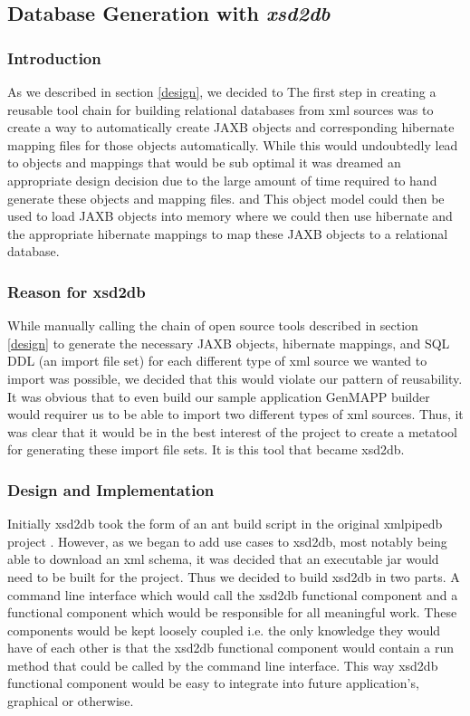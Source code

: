\subsection{Database Generation with \emph{xsd2db}}
\label{xsd2db}
\subsubsection{Introduction}
As we described in section \ref{design}, we decided to 
The first step in creating a reusable tool chain for building relational databases from xml sources was to create a way to automatically create JAXB objects and corresponding hibernate mapping files for those objects automatically.  While this would undoubtedly lead to objects and mappings that would be sub optimal it was dreamed an appropriate design decision due to the large amount of time required to hand generate these objects and mapping files.  and   This object model could then be used to load JAXB objects into memory where we could then use hibernate and the appropriate hibernate mappings to map these JAXB objects to a relational database. 

\subsubsection{Reason for xsd2db}
While manually calling the chain of open source tools described in section \ref{design} to generate the necessary JAXB objects, hibernate mappings, and SQL DDL (an import file set) for each different type of xml source we wanted to import was possible, we decided that this would violate our pattern of reusability.  It was obvious that to even build our sample application GenMAPP builder would requirer us to be able to import two different types of xml sources.   Thus, it was clear that it would be in the best interest of the project to create a metatool for generating these import file sets.  It is this tool that became xsd2db.    
\subsubsection{Design and Implementation}
Initially xsd2db took the form of an ant build script in the original xmlpipedb project \cite{xmlpipedb}.  However, as we began to add use cases to xsd2db, most notably being able to download an xml schema,  it was decided that an executable jar would need to be built for the project.  Thus we decided to build xsd2db in two parts.  A command line interface which would call the xsd2db functional component and a functional component which would be responsible for all meaningful work.  These components would be kept loosely coupled i.e. the only knowledge they would have of each other is that  the xsd2db functional component would contain a run method that could be called by the command line interface.  This way xsd2db functional component would be easy to integrate into future application's, graphical or otherwise.   

